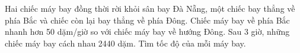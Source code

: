 \begin{ex}[0,5 điểm]%
      Hai chiếc máy bay đồng thời rời khỏi sân bay Đà Nẵng, một chiếc bay thẳng về phía Bắc và chiếc còn lại bay thẳng về phía Đông. Chiếc máy bay về phía Bắc nhanh hơn 50 dặm/giờ so với chiếc máy bay về hướng Đông. Sau 3 giờ, những chiếc máy bay cách nhau 2440 dặm. Tìm tốc độ của mỗi máy bay.
\end{ex}